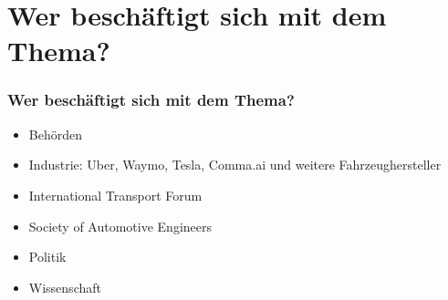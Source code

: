 \section{Wer beschäftigt sich mit dem Thema?}

\begin{frame}
    \frametitle{Wer beschäftigt sich mit dem Thema?}

    \begin{itemize}
        \item Behörden \pause
        \item Industrie: Uber, Waymo, Tesla, Comma.ai und weitere Fahrzeughersteller \pause
        \item International Transport Forum \cite{websiteITF} \pause
        \item Society of Automotive Engineers \cite{websiteSAE} \pause
        \item Politik \pause
        \item Wissenschaft
    \end{itemize}
\end{frame}